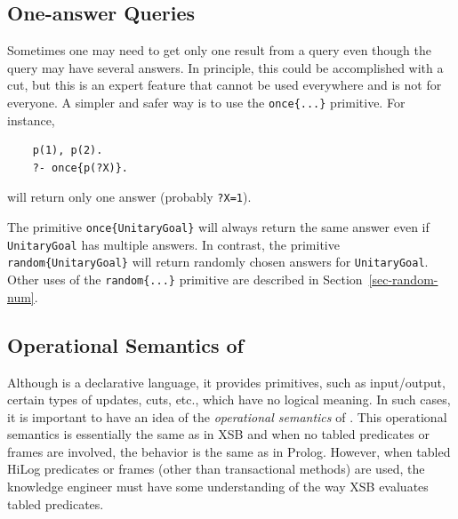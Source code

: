 \documentclass[11pt]{article}
\newcommand{\ERGO}{\mbox{\smaller{\ensuremath{\cal{E}}\smaller{{\sc{RGO}}}}}\xspace}
\newcommand{\FLSYSTEM}{\ERGO}
\begin{document}
\subsection{One-answer Queries}

Sometimes one may need to get only one result from a query even though the
query may have several answers. In principle, this could be accomplished
with a cut, but this is an expert feature that cannot be used everywhere
and is not for everyone.
A simpler and safer way is to use the \texttt{once\{...\}} primitive.
For instance,
\begin{verbatim}
    p(1), p(2).
    ?- once{p(?X)}.
\end{verbatim}
will return only one answer (probably \texttt{?X=1}).

The primitive \texttt{once\{UnitaryGoal\}}
will always return the same answer
even if  \texttt{UnitaryGoal} has multiple answers.
In contrast, the primitive \texttt{random\{UnitaryGoal\}}
will return randomly chosen answers for \texttt{UnitaryGoal}. 
Other uses of the \texttt{random\{...\}} primitive are described in
Section~\ref{sec-random-num}. 



\subsection{Operational Semantics of \FLSYSTEM}\label{sec-flora-operational}

Although \FLSYSTEM is a declarative language, it provides primitives, such as
input/output, certain types of updates, cuts, etc., which have no logical
meaning. In such cases, it is important to have an idea of the
\emph{operational semantics} of \FLSYSTEM. This operational semantics is
essentially the same as in XSB and when no tabled predicates or frames
are involved, the behavior is the same as in Prolog. However, when tabled
HiLog predicates or frames (other than transactional methods) are used,
the knowledge engineer must have some understanding of the way XSB evaluates tabled
predicates.
\end{document}
